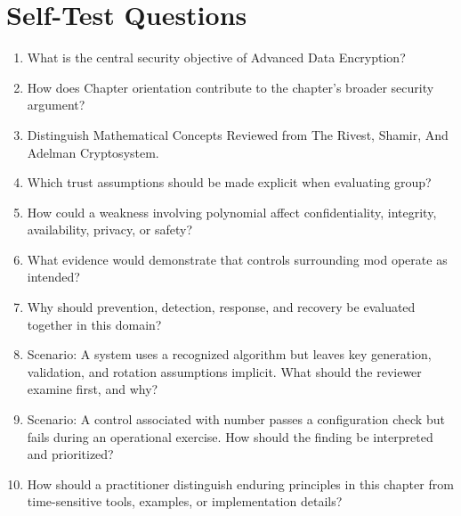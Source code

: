 \documentclass[11pt]{article}
\begin{document}
\section*{Self-Test Questions}
\begin{enumerate}
\item What is the central security objective of Advanced Data Encryption?
\item How does Chapter orientation contribute to the chapter's broader security argument?
\item Distinguish Mathematical Concepts Reviewed from The Rivest, Shamir, And Adelman Cryptosystem.
\item Which trust assumptions should be made explicit when evaluating group?
\item How could a weakness involving polynomial affect confidentiality, integrity, availability, privacy, or safety?
\item What evidence would demonstrate that controls surrounding mod operate as intended?
\item Why should prevention, detection, response, and recovery be evaluated together in this domain?
\item Scenario: A system uses a recognized algorithm but leaves key generation, validation, and rotation assumptions implicit. What should the reviewer examine first, and why?
\item Scenario: A control associated with number passes a configuration check but fails during an operational exercise. How should the finding be interpreted and prioritized?
\item How should a practitioner distinguish enduring principles in this chapter from time-sensitive tools, examples, or implementation details?
\end{enumerate}
\end{document}
